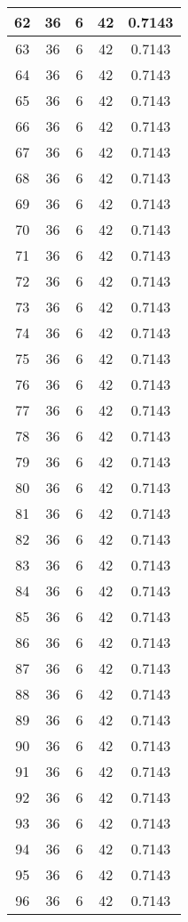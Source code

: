 \documentclass[letterpaper, 12pt]{article}
\begin{document}
\begin{longtable}{|c|c|c|c|c|}
\hline
62 & 36 & 6 & 42 & 0.7143 \\
\hline
63 & 36 & 6 & 42 & 0.7143 \\
\hline
64 & 36 & 6 & 42 & 0.7143 \\
\hline
65 & 36 & 6 & 42 & 0.7143 \\
\hline
66 & 36 & 6 & 42 & 0.7143 \\
\hline
67 & 36 & 6 & 42 & 0.7143 \\
\hline
68 & 36 & 6 & 42 & 0.7143 \\
\hline
69 & 36 & 6 & 42 & 0.7143 \\
\hline
70 & 36 & 6 & 42 & 0.7143 \\
\hline
71 & 36 & 6 & 42 & 0.7143 \\
\hline
72 & 36 & 6 & 42 & 0.7143 \\
\hline
73 & 36 & 6 & 42 & 0.7143 \\
\hline
74 & 36 & 6 & 42 & 0.7143 \\
\hline
75 & 36 & 6 & 42 & 0.7143 \\
\hline
76 & 36 & 6 & 42 & 0.7143 \\
\hline
77 & 36 & 6 & 42 & 0.7143 \\
\hline
78 & 36 & 6 & 42 & 0.7143 \\
\hline
79 & 36 & 6 & 42 & 0.7143 \\
\hline
80 & 36 & 6 & 42 & 0.7143 \\
\hline
81 & 36 & 6 & 42 & 0.7143 \\
\hline
82 & 36 & 6 & 42 & 0.7143 \\
\hline
83 & 36 & 6 & 42 & 0.7143 \\
\hline
84 & 36 & 6 & 42 & 0.7143 \\
\hline
85 & 36 & 6 & 42 & 0.7143 \\
\hline
86 & 36 & 6 & 42 & 0.7143 \\
\hline
87 & 36 & 6 & 42 & 0.7143 \\
\hline
88 & 36 & 6 & 42 & 0.7143 \\
\hline
89 & 36 & 6 & 42 & 0.7143 \\
\hline
90 & 36 & 6 & 42 & 0.7143 \\
\hline
91 & 36 & 6 & 42 & 0.7143 \\
\hline
92 & 36 & 6 & 42 & 0.7143 \\
\hline
93 & 36 & 6 & 42 & 0.7143 \\
\hline
94 & 36 & 6 & 42 & 0.7143 \\
\hline
95 & 36 & 6 & 42 & 0.7143 \\
\hline
96 & 36 & 6 & 42 & 0.7143 \\

\end{longtable}
\end{document}
